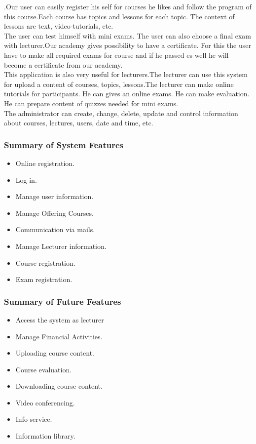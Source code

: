 \documentclass{scrartcl}
\begin{document}
  	.Our user can easily register his self for courses he likes and follow the program of this course.Each course has topics and lessons for each topic. The context of lessons are text, video-tutorials, etc. \\
  	The user can test himself with mini exams. The user can also choose a final exam with lecturer.Our academy gives possibility to have a certificate. For this the user have to make all required exams for course and if he passed es well he will become a certificate from our academy. \\
  	This application is also very useful for lecturers.The lecturer can use this system for upload a content of courses, topics, lessons.The lecturer can make online tutorials for participants. He can gives an online exams. He can make evaluation. He can prepare content of quizzes needed for mini exams.\\
  	The administrator can create, change, delete, update and control information about courses, lectures, users, date and time, etc.
  	
  	
  	\subsubsection{Summary of System Features}
  	\begin{itemize}
  	\item Online registration.
  	\item Log in.
  	\item Manage user information.
  	\item Manage Offering Courses.
  	\item Communication via mails.
  	\item Manage Lecturer information.
  	\item Course registration.
  	\item Exam registration.
  	\end{itemize}
  	
  	\subsubsection{Summary of Future Features}
  	\begin{itemize}
  	\item Access the system as lecturer
  	\item Manage Financial Activities.
  	\item Uploading course content.
  	\item Course evaluation.
  	\item Downloading course content.
  	\item Video conferencing.
  	\item Info service.
  	\item Information library.
  	\end{itemize}
  	
\end{document}
